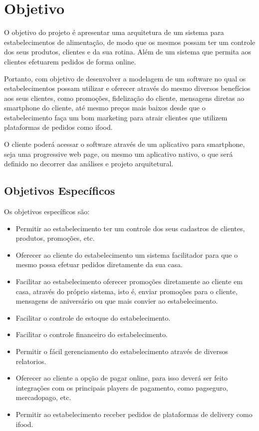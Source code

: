 \chapter{Objetivo}

O objetivo do projeto é apresentar uma arquitetura de um sistema para estabelecimentos de alimentação, de modo
que os mesmos possam ter um controle dos seus produtos, clientes e da sua rotina. Além de um sistema que permita
aos clientes efetuarem pedidos de forma online.

Portanto, com objetivo de desenvolver a modelagem de um software no qual os estabelecimentos possam utilizar e 
oferecer através do mesmo diversos benefícios aos seus clientes, como promoções, fidelização do cliente,
mensagens diretas ao smartphone do cliente, até mesmo preços mais baixos desde que o estabelecimento faça um bom marketing para 
atrair clientes que utilizem plataformas de pedidos como ifood.

O cliente poderá acessar o software através de um aplicativo para smartphone, seja uma progressive
web page, ou mesmo um aplicativo nativo, o que será definido no decorrer das análises e projeto arquitetural.

\section{Objetivos Específicos}
Os objetivos específicos são:

\begin{itemize}
    \item Permitir ao estabelecimento ter um controle dos seus cadastros de clientes, produtos, promoções, etc.
    \item Oferecer ao cliente do estabelecimento um sistema facilitador para que o mesmo possa efetuar pedidos diretamente da sua casa.
    \item Facilitar ao estabelecimento oferecer promoções diretamente ao cliente em casa, através do próprio sistema, isto é, enviar promoções para o cliente, 
    mensagens de aniversário ou que mais convier ao estabelecimento.
    \item Facilitar o controle de estoque do estabelecimento. 
    \item Facilitar o controle financeiro do estabelecimento.
    \item Permitir o fácil gerenciamento do estabelecimento através de diversos relatorios.
    \item Oferecer ao cliente a opção de pagar online, para isso deverá ser feito integrações com os principais players de pagamento, como pagseguro, mercadopago, etc.
    \item Permitir ao estabelecimento receber pedidos de plataformas de delivery como ifood.
\end{itemize}

